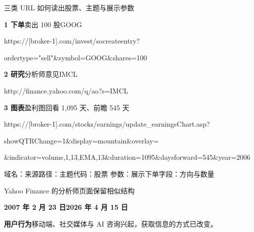 \newcommand{\udomain}[1]{\textcolor{quiet}{#1}}
\newcommand{\upath}[1]{\textcolor{sampleteal}{#1}}
\newcommand{\ucode}[1]{\textcolor{sampleblue}{#1}}
\newcommand{\uparam}[1]{\textcolor{samplegold}{#1}}
\newcommand{\utrade}[1]{\textcolor{wine}{#1}}
\begin{frame}[label=urls]{三类 URL 如何读出股票、主题与展示参数}
  {\small\textbf{1 下单}\quad\utrade{卖出 100 股}\quad\ucode{GOOG}\par}
  {\fontsize{8}{10}\selectfont\ttfamily
  \udomain{https://[broker-1].com}\upath{/invest/socreateentry?}\par
  \utrade{ordertype="sell"}\ucode{\&symbol=GOOG}\utrade{\&shares=100}\par}
  \smallskip
  {\small\textbf{2 研究}\quad\upath{分析师意见}\quad\ucode{IMCL}\par}
  {\fontsize{8}{10}\selectfont\ttfamily
  \udomain{http://finance.yahoo.com}\upath{/q/ao?}\ucode{s=IMCL}\par}
  \medskip
  {\small\textbf{3 图表}\quad\upath{盈利图}\quad\uparam{回看 1,095 天、前瞻 545 天}\par}
  {\fontsize{8}{10}\selectfont\ttfamily
  \udomain{https://[broker-1].com}\upath{/stocks/earnings/update\_earningsChart.asp?}\par
  \uparam{showQTRChange=1\&display=mountain\&overlay=}\par
  \uparam{\&indicator=volume,1,13,EMA,13\&duration=1095\&daysforward=545\&year=2006}\par}
  \par\medskip
  {\footnotesize\udomain{域名：来源}\quad\upath{路径：主题}\quad\ucode{代码：股票}\quad
   \uparam{参数：展示}\quad\utrade{下单字段：方向与数量}}
\end{frame}

\begin{frame}[label=yahoo]{Yahoo Finance 的分析师页面保留相似结构}
  {\centering
  \par}
  {\small\textbf{2007 年 2 月 23 日}\hfill\textbf{2026 年 4 月 15 日}\par}\smallskip
       {\small\textbf{用户行为}\quad 移动端、社交媒体与 AI 咨询兴起，获取信息的方式已改变。}
\end{frame}

